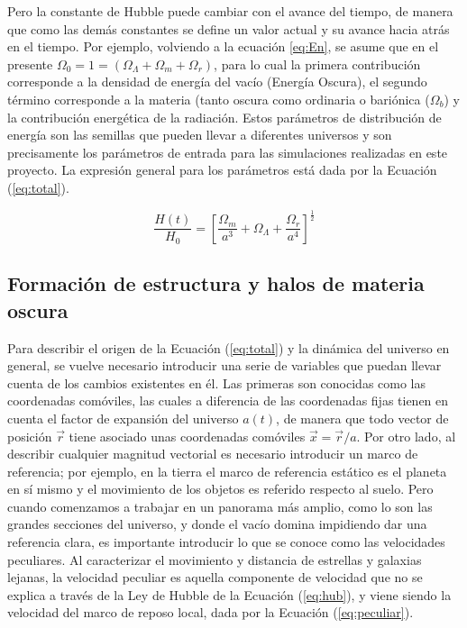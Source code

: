 Pero la constante de Hubble puede cambiar con el avance del tiempo, de manera que como las demás constantes se define un valor actual y su avance hacia atrás en el tiempo. Por ejemplo, volviendo a la ecuación \ref{eq:En}, se asume que en el presente $\Omega_0=1=(\Omega_\Lambda+\Omega_m+\Omega_r)$, para lo cual la primera contribución corresponde a la densidad de energía del vacío (Energía Oscura), el segundo término corresponde a la materia (tanto oscura como ordinaria o bariónica ($\Omega_b$) y la contribución energética de la radiación. Estos parámetros de distribución de energía son las semillas que pueden llevar a diferentes universos y son precisamente los parámetros de entrada para las simulaciones realizadas en este proyecto. La expresión general para los parámetros está dada por la Ecuación (\ref{eq:total}).

\begin{equation}
\frac{H(t)}{H_0}=\left[\frac{\Omega_m}{a^3}+\Omega_\Lambda+\frac{\Omega_r}{a^4}\right]^{\frac{1}{2}}
\label{eq:total}
\end{equation}


\subsection{Formación de estructura y halos de materia oscura}
Para describir el origen de la Ecuación (\ref{eq:total}) y la dinámica del universo en general, se vuelve necesario introducir una serie de variables que puedan llevar cuenta de los cambios existentes en él. Las primeras son conocidas como las coordenadas comóviles, las cuales a diferencia de las coordenadas fijas tienen en cuenta el factor de expansión del universo $a(t)$, de manera que todo vector de posición $\vec{r}$ tiene asociado unas coordenadas comóviles $\vec{x}=\vec{r}/a$. Por otro lado, al describir cualquier magnitud vectorial es necesario introducir un marco de referencia; por ejemplo, en la tierra el marco de referencia estático es el planeta en sí mismo y el movimiento de los objetos es referido respecto al suelo. Pero cuando comenzamos a trabajar en un panorama más amplio, como lo son las grandes secciones del universo, y donde el vacío domina impidiendo dar una referencia clara, es importante introducir lo que se conoce como las velocidades peculiares. Al caracterizar el movimiento y distancia de estrellas y galaxias lejanas, la velocidad peculiar es aquella componente de velocidad que no se explica a través de la Ley de Hubble de la Ecuación (\ref{eq:hub}), y viene siendo la velocidad del marco de reposo local, dada por la Ecuación (\ref{eq:peculiar}).

